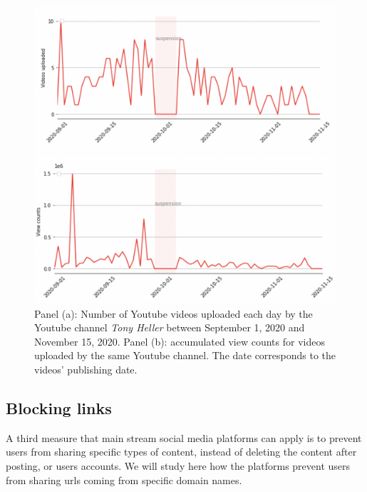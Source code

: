 \documentclass{article}
\begin{document}
\begin{figure}
	\centering
		\begin{multicols}{1}
			\includegraphics[scale=0.3]{./img/tony/fig1_tony.png}
		\end{multicols}
		
		\begin{multicols}{1}
			\includegraphics[scale=0.3]{./img/tony/fig2_tony.png}
		\end{multicols}
	\caption{Panel (a): Number of Youtube videos uploaded each day by the Youtube channel {\it Tony Heller} between September 1, 2020 and November 15, 2020. Panel (b): accumulated view counts for videos uploaded by the same Youtube channel. The date corresponds to the videos’  publishing date. 
}
	\label{fig1_tony}
\end{figure}

\subsection{Blocking links}

A third measure that main stream social media platforms can apply is to prevent users from sharing specific types of content, instead of deleting the content after posting, or users accounts. We will study here how the platforms prevent users from sharing urls coming from specific domain names.
\end{document}
